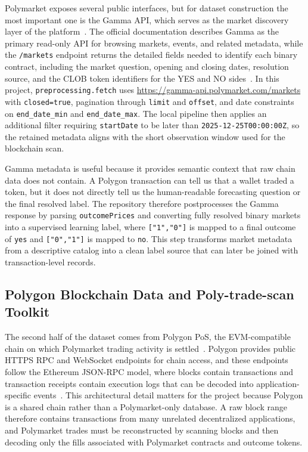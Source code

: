 \documentclass[11pt]{article}
\begin{document}
Polymarket exposes several public interfaces, but for dataset construction the most important one is the Gamma API, which serves as the market discovery layer of the platform~\cite{polymarketApiIntroduction}. The official documentation describes Gamma as the primary read-only API for browsing markets, events, and related metadata, while the \texttt{/markets} endpoint returns the detailed fields needed to identify each binary contract, including the market question, opening and closing dates, resolution source, and the CLOB token identifiers for the YES and NO sides~\cite{polymarketApiIntroduction, polymarketListMarkets}. In this project, \texttt{preprocessing.fetch} uses \url{https://gamma-api.polymarket.com/markets} with \texttt{closed=true}, pagination through \texttt{limit} and \texttt{offset}, and date constraints on \texttt{end\_date\_min} and \texttt{end\_date\_max}. The local pipeline then applies an additional filter requiring \texttt{startDate} to be later than \texttt{2025-12-25T00:00:00Z}, so the retained metadata aligns with the short observation window used for the blockchain scan.

Gamma metadata is useful because it provides semantic context that raw chain data does not contain. A Polygon transaction can tell us that a wallet traded a token, but it does not directly tell us the human-readable forecasting question or the final resolved label. The repository therefore postprocesses the Gamma response by parsing \texttt{outcomePrices} and converting fully resolved binary markets into a supervised learning label, where \texttt{["1","0"]} is mapped to a final outcome of \texttt{yes} and \texttt{["0","1"]} is mapped to \texttt{no}. This step transforms market metadata from a descriptive catalog into a clean label source that can later be joined with transaction-level records.

\subsection{Polygon Blockchain Data and Poly-trade-scan Toolkit}

The second half of the dataset comes from Polygon PoS, the EVM-compatible chain on which Polymarket trading activity is settled~\cite{polygonRpcEndpoints}. Polygon provides public HTTPS RPC and WebSocket endpoints for chain access, and these endpoints follow the Ethereum JSON-RPC model, where blocks contain transactions and transaction receipts contain execution logs that can be decoded into application-specific events~\cite{polygonRpcEndpoints, ethereumJsonRpc}. This architectural detail matters for the project because Polygon is a shared chain rather than a Polymarket-only database. A raw block range therefore contains transactions from many unrelated decentralized applications, and Polymarket trades must be reconstructed by scanning blocks and then decoding only the fills associated with Polymarket contracts and outcome tokens.
\end{document}
